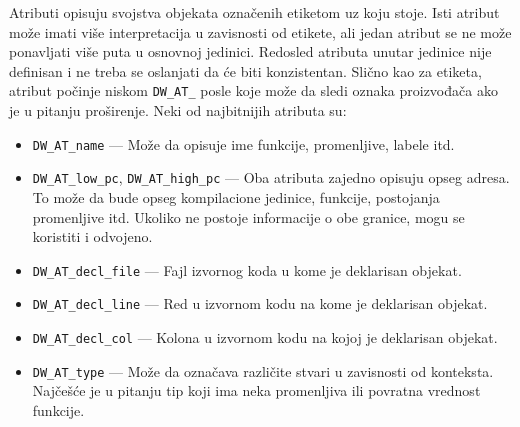 \documentclass[12pt,oneside]{memoir}
\begin{document}
Atributi opisuju svojstva objekata označenih etiketom uz koju stoje.
Isti atribut može imati više interpretacija u zavisnosti od etikete, ali jedan atribut se ne može ponavljati više puta u osnovnoj jedinici.
Redosled atributa unutar jedinice nije definisan i ne treba se oslanjati da će biti konzistentan.
Slično kao za etiketa, atribut počinje niskom \verb|DW_AT_| posle koje može da sledi oznaka proizvođača ako je u pitanju proširenje.
Neki od najbitnijih atributa su:
\begin{itemize}
  \item \verb|DW_AT_name| --- Može da opisuje ime funkcije, promenljive, labele itd.
  \item \verb|DW_AT_low_pc|, \verb|DW_AT_high_pc| --- Oba atributa zajedno opisuju opseg adresa. To može da bude opseg kompilacione jedinice, funkcije, postojanja promenljive itd. Ukoliko ne postoje informacije o obe granice, mogu se koristiti i odvojeno.
  \item \verb|DW_AT_decl_file| --- Fajl izvornog koda u kome je deklarisan objekat.
  \item \verb|DW_AT_decl_line| --- Red u izvornom kodu na kome je deklarisan objekat.
  \item \verb|DW_AT_decl_col| --- Kolona u izvornom kodu na kojoj je deklarisan objekat.
  \item \verb|DW_AT_type| --- Može da označava različite stvari u zavisnosti od konteksta. Najčešće je u pitanju tip koji ima neka promenljiva ili povratna vrednost funkcije. 
\end{itemize}

\end{document}
